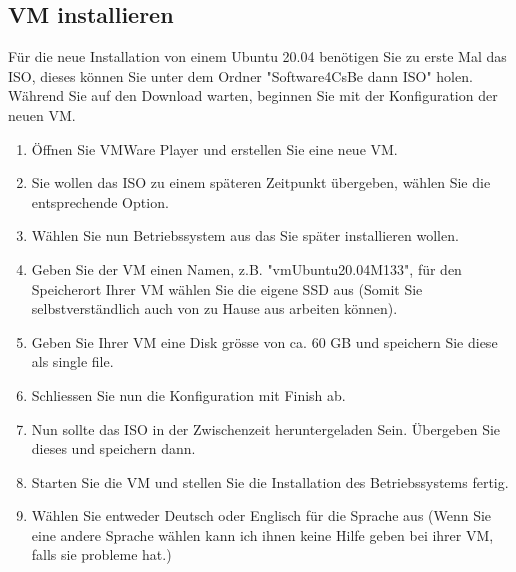\subsection{VM installieren}\label{subsec:vminstallieren}
\begin{frame}[fragile]
    Für die neue Installation von einem Ubuntu 20.04 benötigen Sie zu erste Mal das ISO, dieses können Sie
    unter dem Ordner "Software4CsBe dann ISO" holen.
    Während Sie auf den Download warten, beginnen Sie mit der Konfiguration der neuen VM.
\end{frame}

\begin{frame}[fragile]
    \begin{enumerate}
        \item Öffnen Sie VMWare Player und erstellen Sie eine neue VM.
        \item Sie wollen das ISO zu einem späteren Zeitpunkt übergeben, wählen Sie die entsprechende Option.
        \item Wählen Sie nun Betriebssystem aus das Sie später installieren wollen.
         \newpage
        \item Geben Sie der VM einen Namen, z.B. "vmUbuntu20.04\textunderscore M133", für den Speicherort Ihrer VM wählen Sie die eigene
        SSD aus (Somit Sie selbstverständlich auch von zu Hause aus arbeiten können).
        \item Geben Sie Ihrer VM eine Disk grösse von ca. 60 GB und speichern Sie diese als single file.
        \item Schliessen Sie nun die Konfiguration mit Finish ab.
        \item Nun sollte das ISO in der Zwischenzeit heruntergeladen Sein.
        Übergeben Sie dieses und speichern dann.
        \item Starten Sie die VM und stellen Sie die Installation des Betriebssystems fertig.
        \item Wählen Sie entweder Deutsch oder Englisch für die Sprache aus (Wenn Sie eine andere Sprache wählen kann ich ihnen keine Hilfe geben bei ihrer VM, falls sie probleme hat.)

\end{enumerate}
\end{frame}
